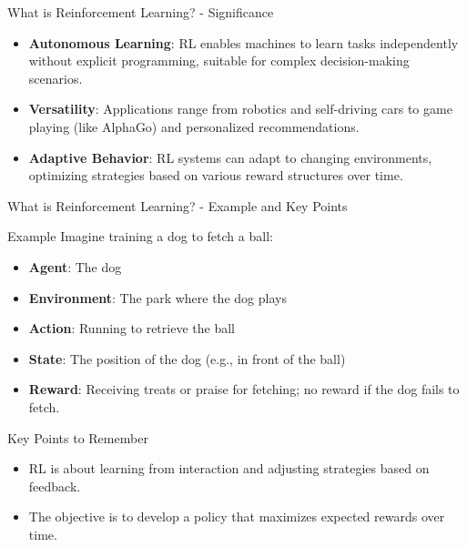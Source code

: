 \documentclass[aspectratio=169]{beamer}
\begin{document}
\begin{frame}[fragile]{What is Reinforcement Learning? - Significance}
    \begin{itemize}
        \item \textbf{Autonomous Learning}: RL enables machines to learn tasks independently without explicit programming, suitable for complex decision-making scenarios.
        \item \textbf{Versatility}: Applications range from robotics and self-driving cars to game playing (like AlphaGo) and personalized recommendations.
        \item \textbf{Adaptive Behavior}: RL systems can adapt to changing environments, optimizing strategies based on various reward structures over time.
    \end{itemize}
\end{frame}

\begin{frame}[fragile]{What is Reinforcement Learning? - Example and Key Points}
    \begin{block}{Example}
        Imagine training a dog to fetch a ball:
        \begin{itemize}
            \item \textbf{Agent}: The dog
            \item \textbf{Environment}: The park where the dog plays
            \item \textbf{Action}: Running to retrieve the ball
            \item \textbf{State}: The position of the dog (e.g., in front of the ball)
            \item \textbf{Reward}: Receiving treats or praise for fetching; no reward if the dog fails to fetch.
        \end{itemize}
    \end{block}
    
    \begin{block}{Key Points to Remember}
        \begin{itemize}
            \item RL is about learning from interaction and adjusting strategies based on feedback.
            \item The objective is to develop a policy that maximizes expected rewards over time.
        \end{itemize}
    \end{block}
\end{frame}
\end{document}
